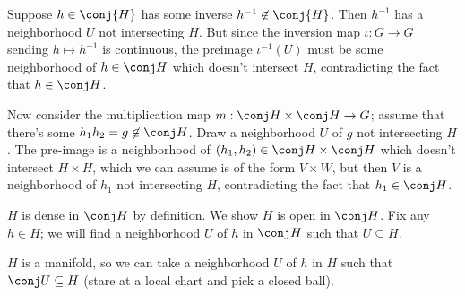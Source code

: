 \documentclass[11pt, headheight=30pt]{scrartcl}
\begin{document}
\begin{walk}
    \item




    Suppose $h \in \conj{H}$ has some inverse
    $h^{-1} \not\in \conj{H}$. Then $h^{-1}$ has
    a neighborhood $U$ not intersecting $H$. But since the
    inversion map $\iota: G\to G$ sending $h \mapsto h^{-1}$
    is continuous, the preimage $\iota^{-1}(U)$ must be some
    neighborhood of $h \in \conj H$ which doesn't intersect
    $H$, contradicting the fact that $h \in \conj H$.

    Now consider the multiplication map
    $m: \conj H \times \conj H \to G$; assume that
    there's some $h_1h_2=g \not\in \conj H$.
    Draw a neighborhood $U$ of $g$ not intersecting
    $H$. The pre-image is a neighborhood of
    $(h_1,h_2) \in \conj H \times \conj H$ which doesn't
    intersect $H \times H$, which we can assume is of the form
    $V\times W$, but then $V$ is a neighborhood of $h_1$
    not intersecting $H$, contradicting the fact that
    $h_1 \in \conj H$.

    \item %
    $H$ is dense in $\conj H$ by definition.
    We show $H$ is open in $\conj H$. Fix any $h \in H$;
    we will find a neighborhood $U$ of $h$ in $\conj H$
    such that $U \subseteq H$. 
    
    $H$ is a manifold, so we can take a neighborhood $U$ of $h$
    in $H$ such that $\conj U \subseteq H$ (stare at a local chart
    and pick a closed ball).
    

\end{walk}
\end{document}
